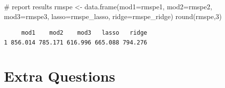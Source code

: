 \documentclass[
  letterpaper,
  DIV=11,
  numbers=noendperiod]{scrreprt}
\newenvironment{Shaded}{\begin{snugshade}}{\end{snugshade}}
\newcommand{\AttributeTok}[1]{\textcolor[rgb]{0.40,0.45,0.13}{#1}}
\newcommand{\CommentTok}[1]{\textcolor[rgb]{0.37,0.37,0.37}{#1}}
\newcommand{\DecValTok}[1]{\textcolor[rgb]{0.68,0.00,0.00}{#1}}
\newcommand{\FunctionTok}[1]{\textcolor[rgb]{0.28,0.35,0.67}{#1}}
\newcommand{\NormalTok}[1]{\textcolor[rgb]{0.00,0.23,0.31}{#1}}
\newcommand{\OtherTok}[1]{\textcolor[rgb]{0.00,0.23,0.31}{#1}}
\begin{document}
\begin{Shaded}
\begin{Highlighting}[]
\CommentTok{\# report results}
\NormalTok{rmspe }\OtherTok{\textless{}{-}} \FunctionTok{data.frame}\NormalTok{(}\AttributeTok{mod1=}\NormalTok{rmspe1, }\AttributeTok{mod2=}\NormalTok{rmspe2, }\AttributeTok{mod3=}\NormalTok{rmspe3, }\AttributeTok{lasso=}\NormalTok{rmspe\_lasso, }\AttributeTok{ridge=}\NormalTok{rmspe\_ridge)}
\FunctionTok{round}\NormalTok{(rmspe,}\DecValTok{3}\NormalTok{)}
\end{Highlighting}
\end{Shaded}

\begin{verbatim}
     mod1    mod2    mod3   lasso   ridge
1 856.014 785.171 616.996 665.088 794.276
\end{verbatim}

\section{Extra Questions}\label{extra-questions-4}
\end{document}
